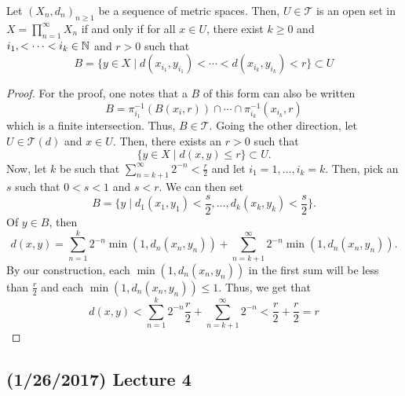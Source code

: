 \documentclass[11pt,leqno,oneside]{amsbook}
\numberwithin{thm}{section}
\newcommand{\Top}{\mathcal{T}}
\begin{document}
\begin{prop}
  Let $(X_n,d_n)_{n \geq 1}$ be a sequence of metric spaces. Then, $U
  \in \Top$ is an open set in $X = \prod_{n=1}^\infty X_n$ if and only
  if for all $x \in U$, there exist $k \geq 0$ and $i_1, < \cdots <
  i_k \in {\mathbb N}$ and $r > 0$ such that \[
    B = \{y \in X \mid d(x_{i_1},y_{i_1}) < \cdots <
    d(x_{i_k},y_{i_k}) < r\} \subset U
  \]
\end{prop}
\begin{proof}
  For the proof, one notes that a $B$ of this form can also be written \[
    B = \pi_{i_1}^{-1}(B(x_i,r)) \cap \cdots \cap \pi_{i_k}^{-1}(x_{i_k},r)
  \]
  which is a finite intersection. Thus, $B \in \Top$. Going the other
  direction, let $U \in \Top(d)$ and $x \in U$. Then, there exists an
  $r > 0$ such that \[
    \{y \in X \mid d(x,y) \leq r\} \subset U.
  \]
  Now, let $k$ be such that $\sum_{n=k+1}^\infty 2^{-n} <
  \frac{r}{2}$ and let $i_1 = 1, \ldots, i_k = k$. Then, pick an $s$
  such that $0 < s < 1$ and $s < r$. We can then set \[
    B = \{y \mid d_1(x_1,y_1) < \frac{s}{2}, \ldots, d_k(x_k,y_k) < \frac{s}{2} \}.
  \]
  Of $y \in B$, then \[
    d(x,y) = \sum_{n=1}^k 2^{-n} \min(1,d_n(x_n,y_n)) +
    \sum_{n=k+1}^\infty 2^{-n} \min(1,d_n(x_n,y_n)).
  \]
  By our construction, each $\min(1,d_n(x_n,y_n))$ in the first sum will be less than
  $\frac{r}{2}$ and each $\min(1,d_n(x_n,y_n)) \leq 1$. Thus, we get
  that \[
    d(x,y) < \sum_{n=1}^k 2^{-n} \frac{r}{2} + \sum_{n=k+1}^\infty
    2^{-n} < \frac{r}{2} + \frac{r}{2} = r
  \]
\end{proof}
\subsection*{(1/26/2017) Lecture 4}
\end{document}
